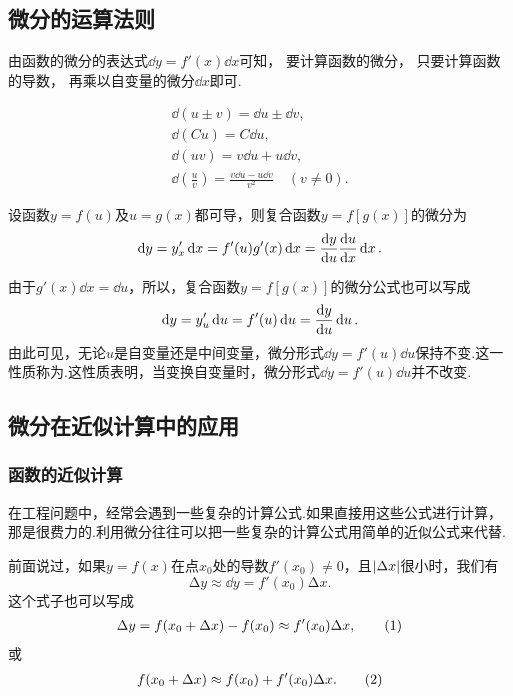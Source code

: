 \subsection{微分的运算法则}
由函数的微分的表达式\(\dd{y} = f'(x) \dd{x}\)可知，
要计算函数的微分，
只要计算函数的导数，
再乘以自变量的微分\(\dd{x}\)即可.

\begin{theorem}
\begin{gather}
	\dd(u \pm v) = \dd{u}\pm\dd{v}, \\
	\dd(C u) = C \dd{u}, \\
	\dd(u v) = v \dd{u} + u \dd{v}, \\
	\dd(\frac{u}{v}) = \frac{v \dd{u} - u \dd{v}}{v^2} \quad (v \neq 0).
\end{gather}
\end{theorem}

\begin{theorem}[复合函数的微分法则]
设函数\(y=f(u)\)及\(u=g(x)\)都可导，则复合函数\(y=f[g(x)]\)的微分为\begin{equation*}
\dd{y}=y'_x\dd{x}=f'(u)g'(x)\dd{x}=\dv{y}{u}\dv{u}{x}\dd{x}.
\end{equation*}

由于\(g'(x)\dd{x}=\dd{u}\)，所以，复合函数\(y=f[g(x)]\)的微分公式也可以写成\begin{equation*}
\dd{y}=y'_u\dd{u}=f'(u)\dd{u}=\dv{y}{u}\dd{u}.
\end{equation*}由此可见，无论\(u\)是自变量还是中间变量，微分形式\(\dd{y}=f'(u)\dd{u}\)保持不变.这一性质称为.这性质表明，当变换自变量时，微分形式\(\dd{y}=f'(u)\dd{u}\)并不改变.
\end{theorem}

\subsection{微分在近似计算中的应用}
\subsubsection{函数的近似计算}
在工程问题中，经常会遇到一些复杂的计算公式.如果直接用这些公式进行计算，那是很费力的.利用微分往往可以把一些复杂的计算公式用简单的近似公式来代替.

前面说过，如果\(y=f(x)\)在点\(x_0\)处的导数\(f'(x_0)\neq0\)，且\(\abs{\Delta x}\)很小时，我们有\begin{equation*}
\increment y \approx\dd{y} = f'(x_0) \increment x.
\end{equation*}这个式子也可以写成\begin{gather}
\increment y = f(x_0 + \increment x) - f(x_0) \approx f'(x_0) \increment x, \tag1
\end{gather}或\begin{gather}
f(x_0 + \increment x) \approx f(x_0) + f'(x_0) \increment x. \tag2
\end{gather}

